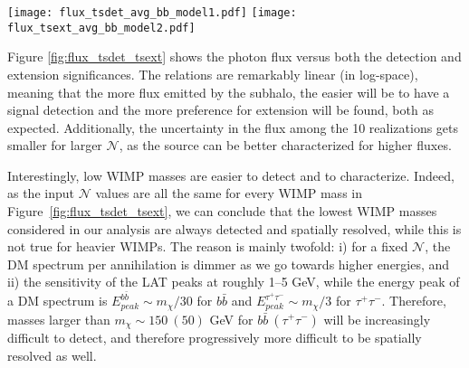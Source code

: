 \documentclass[%
 reprint,
nofootinbib,
 amsmath,amssymb,
 aps,
]{revtex4-2}
\begin{document}
\begin{figure*}[!ht]
\centering
\texttt{[image: flux\_tsdet\_avg\_bb\_model1.pdf]}
\texttt{[image: flux\_tsext\_avg\_bb\_model2.pdf]}
\caption{Comparison of the integrated source flux with the corresponding detection ($\mathrm{TS_{det}}$; left panel) and extension significances ($\mathrm{TS_{ext}}$; right panel), for the two subhalo models and $b\bar{b}$ annihilation channel, {  as a function of the source flux.} Each point is averaged across the 10 different realizations of the same setup. As in Section \ref{sec:fmin}, the two subhalo models that we consider turn out to be completely indistinguishable within errors, and therefore we show only one of them in each case.}
\label{fig:flux_tsdet_tsext}
\end{figure*}

Figure \ref{fig:flux_tsdet_tsext} shows the photon flux versus both the detection and extension significances. The relations are remarkably linear (in log-space), meaning that the more flux emitted by the subhalo, the easier will be to have a signal detection and the more preference for extension will be found, both as expected. Additionally, the uncertainty in the flux among the 10 realizations gets smaller for larger $\mathcal{N}$, as the source can be better characterized for higher fluxes. 

Interestingly, low WIMP masses are easier to detect and to characterize. Indeed, as the input $\mathcal{N}$ values are all the same for every WIMP mass in Figure~\ref{fig:flux_tsdet_tsext}, we can conclude that the lowest WIMP masses considered in our analysis are always detected and spatially resolved, while this is not true for heavier WIMPs. %
The reason is mainly twofold: i) for a fixed $\mathcal{N}$, the DM spectrum per annihilation is dimmer as we go towards higher energies, and ii) the sensitivity of the LAT peaks at roughly 1--5 GeV, while the energy peak of a DM spectrum is $E_{peak}^{b\bar{b}}\sim m_{\chi}/30$ for $b\bar{b}$ and $E_{peak}^{\tau^+\tau^-}\sim m_{\chi}/3$ for $\tau^+\tau^-$. Therefore, masses larger than $m_{\chi}\sim 150~(50)$ GeV for $b\bar{b}~(\tau^+\tau^-)$ will be increasingly difficult to detect, and therefore progressively more difficult to be spatially resolved as well.
\end{document}
